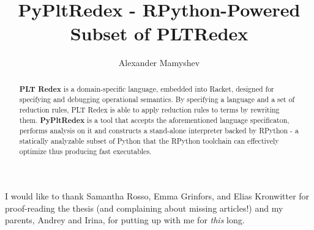 \documentclass[mscthesis, 11pt]{usiinfthesis}
\title{PyPltRedex - RPython-Powered Subset of PLTRedex} %
\author{Alexander Mamyshev} %
\begin{document}
\maketitle %

\frontmatter %

\begin{abstract}
\textbf{PLT Redex} is a domain-specific language, embedded into Racket, designed for specifying and debugging operational semantics.  By specifying a language and a set of reduction rules, PLT Redex is able to apply reduction rules to terms by rewriting them. \textbf{PyPltRedex} is a tool that accepts the aforementioned language specificaton, performs analysis on it and constructs a stand-alone interpreter backed by RPython - a statically analyzable subset of Python that the RPython toolchain can effectively optimize thus producing fast executables.
\end{abstract}


\begin{acknowledgements}
I would like to thank Samantha Rosso, Emma Grinfors, and Elias Kronwitter for proof-reading the thesis (and complaining about missing articles!) and my parents, Andrey and Irina, for putting up with me for \textit{this} long.
\end{acknowledgements}

\tableofcontents 

\mainmatter










%


\backmatter

%
%



\end{document}

